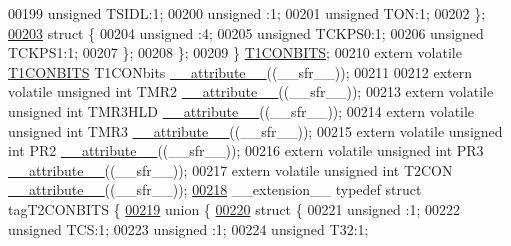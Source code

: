 \begin{DoxyCode}
00199       \textcolor{keywordtype}{unsigned} TSIDL:1;
00200       \textcolor{keywordtype}{unsigned} :1;
00201       \textcolor{keywordtype}{unsigned} TON:1;
00202     \};
\hypertarget{a00009_source_l00203}{}\hyperlink{a00009}{00203}     \textcolor{keyword}{struct }\{
00204       \textcolor{keywordtype}{unsigned} :4;
00205       \textcolor{keywordtype}{unsigned} TCKPS0:1;
00206       \textcolor{keywordtype}{unsigned} TCKPS1:1;
00207     \};
00208   \};
00209 \} \hyperlink{a00008_df/d0c/a00788}{T1CONBITS};
00210 \textcolor{keyword}{extern} \textcolor{keyword}{volatile} \hyperlink{a00008_df/d0c/a00788}{T1CONBITS} T1CONbits \hyperlink{a00009_a493c46f03454991ccc5aa7a6e1dfb2a7}{\_\_attribute\_\_}((\_\_sfr\_\_));
00211 
00212 \textcolor{keyword}{extern} \textcolor{keyword}{volatile} \textcolor{keywordtype}{unsigned} \textcolor{keywordtype}{int}  TMR2 \hyperlink{a00009_a493c46f03454991ccc5aa7a6e1dfb2a7}{\_\_attribute\_\_}((\_\_sfr\_\_));
00213 \textcolor{keyword}{extern} \textcolor{keyword}{volatile} \textcolor{keywordtype}{unsigned} \textcolor{keywordtype}{int}  TMR3HLD \hyperlink{a00009_a493c46f03454991ccc5aa7a6e1dfb2a7}{\_\_attribute\_\_}((\_\_sfr\_\_));
00214 \textcolor{keyword}{extern} \textcolor{keyword}{volatile} \textcolor{keywordtype}{unsigned} \textcolor{keywordtype}{int}  TMR3 \hyperlink{a00009_a493c46f03454991ccc5aa7a6e1dfb2a7}{\_\_attribute\_\_}((\_\_sfr\_\_));
00215 \textcolor{keyword}{extern} \textcolor{keyword}{volatile} \textcolor{keywordtype}{unsigned} \textcolor{keywordtype}{int}  PR2 \hyperlink{a00009_a493c46f03454991ccc5aa7a6e1dfb2a7}{\_\_attribute\_\_}((\_\_sfr\_\_));
00216 \textcolor{keyword}{extern} \textcolor{keyword}{volatile} \textcolor{keywordtype}{unsigned} \textcolor{keywordtype}{int}  PR3 \hyperlink{a00009_a493c46f03454991ccc5aa7a6e1dfb2a7}{\_\_attribute\_\_}((\_\_sfr\_\_));
00217 \textcolor{keyword}{extern} \textcolor{keyword}{volatile} \textcolor{keywordtype}{unsigned} \textcolor{keywordtype}{int}  T2CON \hyperlink{a00009_a493c46f03454991ccc5aa7a6e1dfb2a7}{\_\_attribute\_\_}((\_\_sfr\_\_));
\hypertarget{a00009_source_l00218}{}\hyperlink{a00008}{00218} \_\_extension\_\_ \textcolor{keyword}{typedef} \textcolor{keyword}{struct }tagT2CONBITS \{
\hypertarget{a00009_source_l00219}{}\hyperlink{a00009}{00219}   \textcolor{keyword}{union }\{
\hypertarget{a00009_source_l00220}{}\hyperlink{a00009}{00220}     \textcolor{keyword}{struct }\{
00221       \textcolor{keywordtype}{unsigned} :1;
00222       \textcolor{keywordtype}{unsigned} TCS:1;
00223       \textcolor{keywordtype}{unsigned} :1;
00224       \textcolor{keywordtype}{unsigned} T32:1;

\end{DoxyCode}
